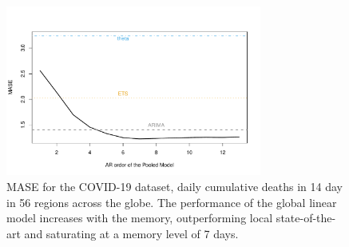 \documentclass[a4paper]{article}
\theoremstyle{custom}
\begin{document}
\begin{figure}
  \centering
  \includegraphics[width=0.75\textwidth]{fig/covid.pdf}
  \caption{MASE for the COVID-19 dataset, daily cumulative deaths in 14 day in 56 regions across the globe. The performance of the global linear model increases with the memory, outperforming local state-of-the-art and saturating at a memory level of 7 days. }
  \label{fig:COVID19}
\end{figure}

%
%
\end{document}

